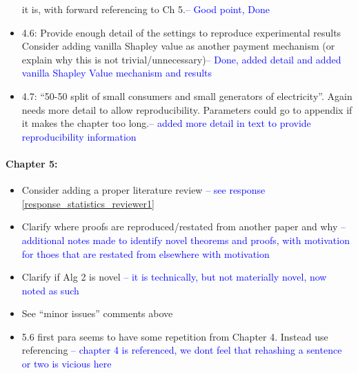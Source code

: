 \documentclass{article}
\begin{document}
\begin{itemize}
it is, with forward referencing to Ch 5.\textcolor{blue}{-- Good point, Done}
\item	4.6: Provide enough detail of the settings to reproduce experimental results
Consider adding vanilla Shapley value as another payment mechanism (or explain why this is
not trivial/unnecessary)\textcolor{blue}{-- Done, added detail and added vanilla Shapley Value mechanism and results}
\item	4.7: “50-50 split of small consumers and small generators of electricity”. Again needs more
detail to allow reproducibility. Parameters could go to appendix if it makes the chapter too
long.\textcolor{blue}{-- added more detail in text to provide reproducibility information}
\end{itemize}

\paragraph{Chapter 5:}\begin{itemize}
\item	Consider adding a proper literature review \textcolor{blue}{-- see response \eqref{response_statistics_reviewer1}}
\item	Clarify where proofs are reproduced/restated from another paper and why \textcolor{blue}{-- additional notes made to identify novel theorems and proofs, with motivation for thoes that are restated from elsewhere with motivation}
\item	Clarify if Alg 2 is novel \textcolor{blue}{-- it is technically, but not materially novel, now noted as such}
\item	See “minor issues” comments above
\item	5.6 first para seems to have some repetition from Chapter 4. Instead use referencing \textcolor{blue}{-- chapter 4 is referenced, we dont feel that rehashing a sentence or two is vicious here}
\end{itemize}
\end{document}
